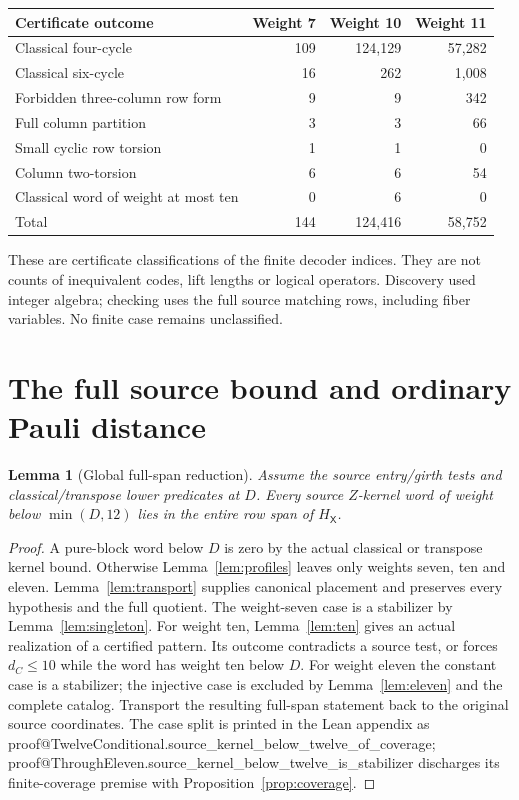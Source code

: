 \documentclass[11pt]{article}
\makeatletter
\newtheorem{lemma}[theorem]{Lemma}
\theoremstyle{definition}\newtheorem{definition}[theorem]{Definition}
\newcommand{\HX}{H_{\mathsf X}}\newcommand{\HZ}{H_{\mathsf Z}}
\newcommand{\lean}[2]{\csname proof@#1.#2\endcsname}
\makeatother
\begin{document}
\begin{center}\small
\begin{tabular}{@{}lrrr@{}}
\toprule Certificate outcome & Weight 7 & Weight 10 & Weight 11\\\midrule
Classical four-cycle &109&124,129&57,282\\
Classical six-cycle &16&262&1,008\\
Forbidden three-column row form &9&9&342\\
Full column partition &3&3&66\\
Small cyclic row torsion &1&1&0\\
Column two-torsion &6&6&54\\
Classical word of weight at most ten &0&6&0\\\midrule
Total &144&124,416&58,752\\\bottomrule
\end{tabular}
\end{center}
These are certificate classifications of the finite decoder indices. They
are not counts of inequivalent codes, lift lengths or logical operators.
Discovery used integer algebra; checking uses the full source matching rows,
including fiber variables. No finite case remains unclassified.

\section{The full source bound and ordinary Pauli distance}\label{sec:assembly}
\begin{lemma}[Global full-span reduction]\label{lem:global}
Assume the source entry/girth tests and classical/transpose lower predicates
at $D$. Every source $Z$-kernel word of weight below $\min(D,12)$ lies in the
entire row span of $\HX$.
\end{lemma}
\begin{proof}
A pure-block word below $D$ is zero by the actual classical or transpose
kernel bound. Otherwise Lemma~\ref{lem:profiles} leaves only weights seven,
ten and eleven. Lemma~\ref{lem:transport} supplies canonical placement and
preserves every hypothesis and the full quotient.
The weight-seven case is a stabilizer by Lemma~\ref{lem:singleton}.
For weight ten, Lemma~\ref{lem:ten} gives an actual realization of a certified
pattern. Its outcome contradicts a source test, or forces $d_C\leq10$ while
the word has weight ten below $D$. For weight eleven the constant case is a
stabilizer; the injective case is excluded by Lemma~\ref{lem:eleven} and the
complete catalog. Transport the resulting full-span statement back to the
original source coordinates. The case split is printed in the Lean appendix
as \lean{TwelveConditional}{source_kernel_below_twelve_of_coverage};
\lean{ThroughEleven}{source_kernel_below_twelve_is_stabilizer} discharges its
finite-coverage premise with Proposition~\ref{prop:coverage}.
\end{proof}
\end{document}
